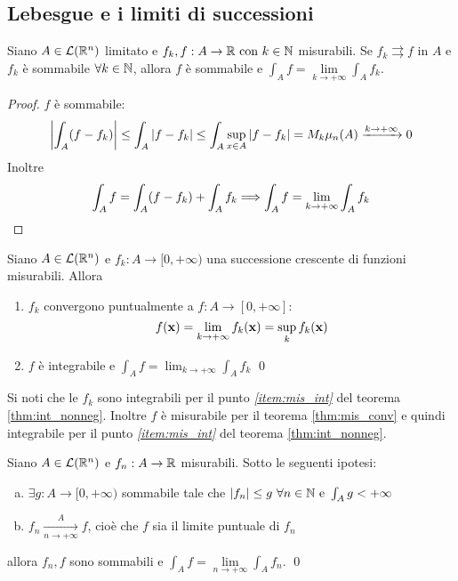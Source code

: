 \subsection{Lebesgue e i limiti di successioni}

\begin{theorem}
	Siano $A\in \mathcal{L}(\mathbb{R}^n)$ limitato e $f_k,f:A\to\mathbb{R} \text{ con } k \in \mathbb{N}$ misurabili. Se $f_k \rightrightarrows f$ in $A$ e $f_k$ è sommabile $\forall k \in \mathbb{N}$, allora $f$ è sommabile e $\int_A f = \lim\limits_{k\to+\infty}\int_Af_k$.
\end{theorem}

\begin{proof}
	$f$ è sommabile:
	$$\displaystyle\abs{\int_A (f-f_k)}\leq \int_A\abs{f-f_k}\leq \int_A\sup_{x \in A}\abs{f-f_k}=M_k\mu_n(A)\xrightarrow{k\to+\infty}0$$
	Inoltre
	$$
		\int_Af=\int_A(f-f_k)+\int_Af_k\Longrightarrow \int_Af=\lim_{k\to+\infty}\int_Af_k
	$$
\end{proof}

\begin{theorem}
	Siano $A \in \mathcal{L}(\mathbb{R}^n)$ e $f_k:A\to[0,+\infty)$ una successione crescente di funzioni misurabili. Allora
	\begin{enumerate}
		\item $f_k$ convergono puntualmente a $f: A\to[0,+\infty]$: $$f(\vb{x})=\lim\limits_{k\to+\infty}f_k(\vb{x})=\sup_kf_k(\vb{x})$$
		\item $f$ è integrabile e $\displaystyle\int_Af=\lim_{k\to+\infty}\int_Af_k$
		\qed
	\end{enumerate}
\end{theorem}

\begin{remark}
	Si noti che le $f_k$ sono integrabili per il punto \textit{\ref{item:mis_int}} del teorema \ref{thm:int_nonneg}. Inoltre $f$ è misurabile per il teorema \ref{thm:mis_conv} e quindi integrabile per il punto \textit{\ref{item:mis_int}} del teorema \ref{thm:int_nonneg}.
\end{remark}

\begin{theorem}
	Siano $A\in \mathcal{L}(\mathbb{R}^n)$ e $f_n:A\to\mathbb{R}$ misurabili. Sotto le seguenti ipotesi:
	\begin{enumerate}[a.]
		\item $\exists g:A\to[0,+\infty)$ sommabile tale che $\abs{f_n}\leq g\ \forall n \in \mathbb{N} \text{ e } \int_Ag<+\infty$
		\item $f_n\xrightarrow[n\to+\infty]{A}f$, cioè che $f$ sia il limite puntuale di $f_n$
	\end{enumerate}
	allora $f_n,f$ sono sommabili e $\int_Af=\lim\limits_{n\to+\infty}\int_Af_n$.
	\qed
\end{theorem}
